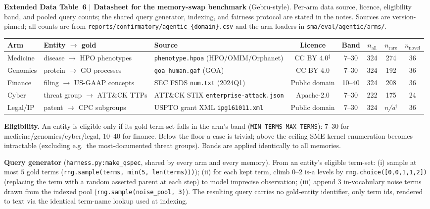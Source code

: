 \documentclass[pdflatex,sn-nature]{sn-jnl}
\newcommand{\edcaption}[1]{\par{\small #1}\par\smallskip}
\begin{document}
\begin{appendices}
\begin{table}[htbp]
\centering
\edcaption{\textbf{Extended Data Table~6 $|$ Datasheet for the memory-swap
    benchmark} (Gebru-style). Per-arm data source, licence, eligibility band, and
  pooled query counts; the shared query generator, indexing, and fairness
  protocol are stated in the notes. Sources are version-pinned; all counts are
  from \texttt{reports/confirmatory/agentic\_\{domain\}.csv} and the arm loaders
  in \texttt{sma/eval/agentic/arms/}.}
\small
\setlength{\tabcolsep}{4pt}
\begin{adjustbox}{max width=\textwidth}\begin{tabular}{lllccccc}
\toprule
\textbf{Arm} & \textbf{Entity $\to$ gold} & \textbf{Source} & \textbf{Licence} &
  \textbf{Band} & \textbf{$n_\text{all}$} & \textbf{$n_\text{rare}$} & \textbf{$n_\text{novel}$} \\
\midrule
Medicine & disease $\to$ HPO phenotypes      & \texttt{phenotype.hpoa} (HPO/OMIM/Orphanet) & CC BY 4.0$^{\ddagger}$ & 7--30  & 324 & 274 & 36 \\
Genomics & protein $\to$ GO processes         & \texttt{goa\_human.gaf} (GOA)              & CC BY 4.0              & 7--30  & 324 & 192 & 36 \\
Finance  & filing $\to$ US-GAAP concepts      & SEC FSDS \texttt{num.txt} (2024Q1)         & Public domain          & 10--40 & 324 & 208 & 36 \\
Cyber    & threat group $\to$ ATT\&CK TTPs    & ATT\&CK STIX \texttt{enterprise-attack.json} & Apache-2.0           & 7--30  & 222 & 175 & 24 \\
Legal/IP & patent $\to$ CPC subgroups         & USPTO grant XML \texttt{ipg161011.xml}     & Public domain          & 7--30  & 324 & \textit{n/a}$^{\dagger}$ & 36 \\
\bottomrule
\end{tabular}\end{adjustbox}
\begin{flushleft}
{\footnotesize
\textbf{Eligibility.} An entity is eligible only if its gold term-set falls in the
arm's band (\texttt{MIN\_TERMS}--\texttt{MAX\_TERMS}): 7--30 for
medicine/genomics/cyber/legal, 10--40 for finance. Below the floor a case is
trivial; above the ceiling SME kernel enumeration becomes intractable (excluding
e.g.\ the most-documented threat groups). Bands are applied identically to all
memories.

\textbf{Query generator} (\texttt{harness.py:make\_qspec}, shared by every arm and
every memory). From an entity's eligible term-set: (i) sample at most $5$ gold
terms (\texttt{rng.sample(terms, min(5, len(terms)))}); (ii) for each kept term,
climb $0$--$2$ is-a levels by \texttt{rng.choice([0,0,1,1,2])} (replacing the term
with a random asserted parent at each step) to model imprecise observation;
(iii) append $3$ in-vocabulary noise terms drawn from the indexed pool
(\texttt{rng.sample(noise\_pool, 3)}). The resulting query carries no gold-entity
identifier, only term ids, rendered to text via the identical term-name lookup
used at indexing.

}
\end{flushleft}
\end{table}
\end{appendices}
\end{document}
